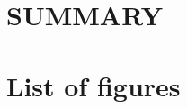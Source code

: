 \documentclass[
12pt, %
a4paper, %
oneside, %
headinclude,footinclude, %
BCOR5mm, %
]{scrartcl}
\begin{document}

\section{SUMMARY}



\section{List of figures}







% 


\end{document}
